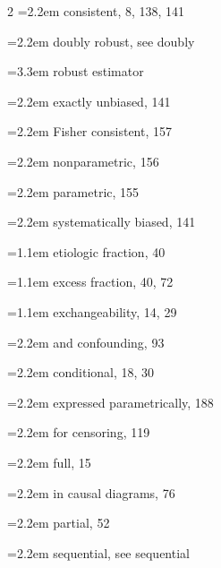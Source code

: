 \begin{multicols}{2}
\hspace*{1.1em}\hangindent=2.2em consistent, 8, 138, 141\par
\hspace*{1.1em}\hangindent=2.2em doubly robust, see doubly\par
\hspace*{2.2em}\hangindent=3.3em robust estimator\par
\hspace*{1.1em}\hangindent=2.2em exactly unbiased, 141\par
\hspace*{1.1em}\hangindent=2.2em Fisher consistent, 157\par
\hspace*{1.1em}\hangindent=2.2em nonparametric, 156\par
\hspace*{1.1em}\hangindent=2.2em parametric, 155\par
\hspace*{1.1em}\hangindent=2.2em systematically biased, 141\par
\hangindent=1.1em etiologic fraction, 40\par
\hangindent=1.1em excess fraction, 40, 72\par
\hangindent=1.1em exchangeability, 14, 29\par
\hspace*{1.1em}\hangindent=2.2em and confounding, 93\par
\hspace*{1.1em}\hangindent=2.2em conditional, 18, 30\par
\hspace*{1.1em}\hangindent=2.2em expressed parametrically, 188\par
\hspace*{1.1em}\hangindent=2.2em for censoring, 119\par
\hspace*{1.1em}\hangindent=2.2em full, 15\par
\hspace*{1.1em}\hangindent=2.2em in causal diagrams, 76\par
\hspace*{1.1em}\hangindent=2.2em partial, 52\par
\hspace*{1.1em}\hangindent=2.2em sequential, see sequential\par

\end{multicols}
